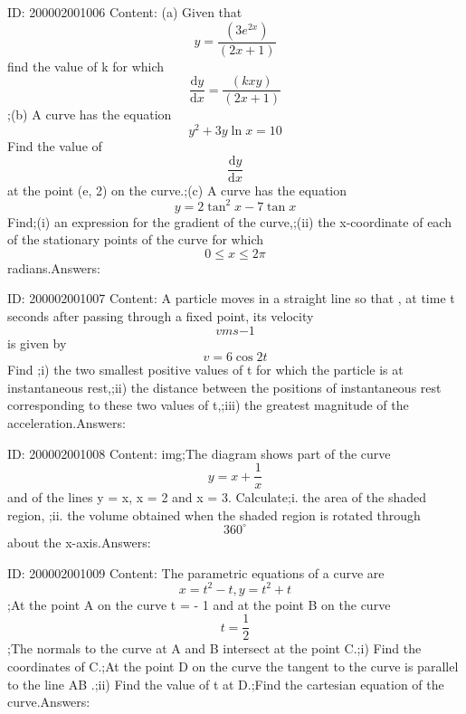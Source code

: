 \documentclass{article}
\begin{document}
ID: 200002001006
Content:
(a)	Given that \[y=\frac{(3e^{2x})}{(2x+1)}\]  find the value of k for which \[\frac{\mathrm{d} y}{\mathrm{d} x}=\frac{(kxy)}{(2x+1)}\];(b) A curve has the equation  \[y^2+3y \ln x=10\] Find the value of \[\frac{\mathrm{d} y}{\mathrm{d} x}\] at the point (e, 2) on the curve.;(c) A curve has the equation \[y=2\tan^2x-7\tan x\] Find;(i)	an expression for the gradient of the curve,;(ii)	the x-coordinate of each of the stationary points of the curve for which \[0\leq x\leq 2\pi\] radians.Answers:

ID: 200002001007
Content:
A particle moves in a straight line so that , at time t seconds after passing through a fixed point, its velocity \[v m s{-1}\] is given by \[v = 6 \cos 2t\] Find ;i) the two smallest positive values of t for which  the particle is at instantaneous rest,;ii) the distance between the positions of instantaneous rest corresponding to these two values of t,;iii) the greatest magnitude of the acceleration.Answers:

ID: 200002001008
Content:
img;The diagram shows part of the curve \[y=x+\frac{1}{x}\] and of the lines y = x, x = 2 and x = 3. Calculate;i. the area of the shaded region, ;ii. the volume obtained when the shaded region is rotated through \[360^{\circ}\] about the x-axis.Answers:

ID: 200002001009
Content:
The parametric equations of a curve are \[x=t^2-t, y=t^2+t\];At the point A on the curve t = - 1 and at the point B on the curve \[t=\frac{1}{2}\] ;The normals to the curve at A and B intersect at the point C.;i) Find the coordinates of C.;At the point D on the curve the tangent to the curve is parallel to the line AB .;ii) Find the value of t at D.;Find the cartesian equation of the curve.Answers:
\end{document}
